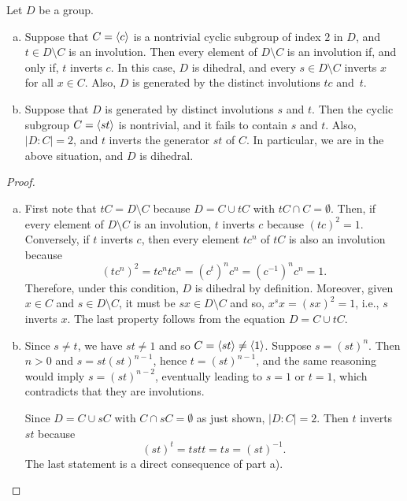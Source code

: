 \begin{lem}\label{dihedral-lemma}
    Let $D$ be a group.
    \begin{enumerate}[a),font=\upshape]
        \item Suppose that\/ $C = \langle c\rangle$ is a nontrivial cyclic subgroup of index\/ $2$ in\/ $D$, and\/ $t \in D\setminus C$ is an involution. Then every element of\/ $D\setminus C$ is an involution if, and only if, $t$ inverts $c$. In this case, $D$ is dihedral, and every $s\in D\setminus C$ inverts $x$ for all $x \in C$. Also, $D$ is generated by the distinct involutions $tc$ and~$t$.
        
        \item Suppose that\/ $D$ is generated by distinct involutions\/ $s$ and\/ $t$. Then the cyclic subgroup\/ $C = \langle st\rangle$ is nontrivial, and it fails to contain\/ $s$ and\/ $t$. Also, $|D:C| = 2$, and\/ $t$ inverts the generator\/ $st$ of\/ $C$. In particular, we are in the above situation, and\/ $D$ is dihedral.
    \end{enumerate}
\end{lem}

\begin{proof}\ 

\begin{enumerate}[a),font=\upshape]
    \item First note that $tC=D\setminus C$ because $D=C\cup tC$ with $tC\cap C=\emptyset$. Then, if every element of $D\setminus C$ is an involution, $t$ inverts $c$ because $(tc)^2=1$. Conversely, if $t$ inverts $c$, then every element $tc^n$ of $tC$ is also an involution because
    $$
        (tc^n)^2=tc^ntc^n=(c^t)^nc^n=(c^{-1})^nc^n=1.
    $$
    Therefore, under this condition, $D$ is dihedral by definition. Moreover, given $x\in C$ and $s\in D\setminus C$, it must be $sx\in D\setminus C$ and so, $x^sx=(sx)^2=1$, i.e., $s$ inverts $x$. The last property follows from the equation $D=C\cup tC$.

    \item Since $s\ne t$, we have $st\ne1$ and so $C=\langle st\rangle\ne\langle1\rangle$. Suppose $s=(st)^n$. Then $n>0$ and $s=st(st)^{n-1}$, hence $t=(st)^{n-1}$, and the same reasoning would imply $s=(st)^{n-2}$, eventually leading to $s=1$ or $t=1$, which contradicts that they are involutions.

    Since $D=C\cup sC$ with $C\cap sC=\emptyset$ as just shown, $|D:C|=2$. Then $t$ inverts $st$ because
    $$
        (st)^t=tstt=ts=(st)^{-1}.
    $$
    The last statement is a direct consequence of part a).
\end{enumerate}
\end{proof}


